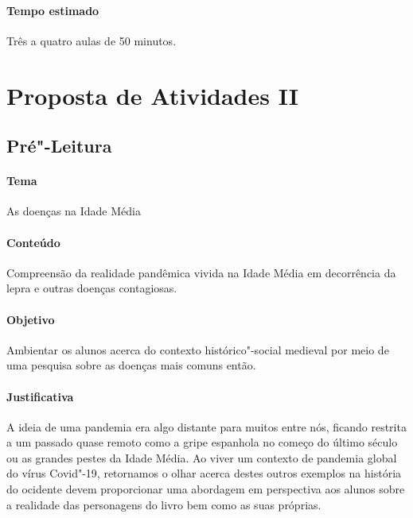\documentclass[12pt]{extarticle}
\begin{document}
 \paragraph{Tempo estimado} Três a quatro aulas de 50 minutos. 


\section{Proposta de Atividades II}

\subsection{Pré"-Leitura}

 \paragraph{Tema} As doenças na Idade Média

 \paragraph{Conteúdo} Compreensão da realidade pandêmica vivida na Idade
 Média em decorrência da lepra e outras doenças contagiosas.

 \paragraph{Objetivo} Ambientar os alunos acerca do contexto histórico"-social 
 medieval por meio de uma pesquisa sobre as doenças mais comuns então.

 \paragraph{Justificativa} A ideia de uma pandemia era algo distante para
 muitos entre nós, ficando restrita a um passado quase remoto como a gripe
 espanhola no começo do último século ou as grandes pestes da Idade Média. 
 Ao viver um contexto de pandemia global do vírus Covid"-19, retornamos o
 olhar acerca destes outros exemplos na história do ocidente devem proporcionar 
 uma abordagem em perspectiva aos alunos sobre a realidade das personagens 
 do livro bem como as suas próprias.
\end{document}
